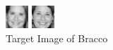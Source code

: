 \documentclass[12pt]{article} %
\begin{document}
\begin{figure}[H] %
  \centering 
  \begin{minipage}[b]{0.2\textwidth}
    \includegraphics[width=\textwidth]{part3_3_1_correct_bracco}
    \caption{Target Image of Bracco}
  \end{minipage}
  \begin{minipage}[b]{0.1\textwidth}
    \includegraphics[width=\textwidth]{part3_3_1_error1_bracco}

\end{minipage}
\end{figure}
\end{document}
